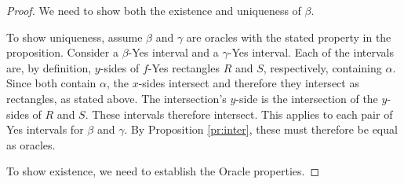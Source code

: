 \documentclass[12pt]{article}
\theoremstyle{remark}
\begin{document}
\begin{proof}
We need to show both the existence and uniqueness of $\beta$.

To show uniqueness, assume $\beta$ and $\gamma$ are oracles with the stated property in the proposition. Consider a $\beta$-Yes interval and a  $\gamma$-Yes interval. Each of the intervals are, by definition, $y$-sides of $f$-Yes rectangles $R$ and $S$, respectively, containing $\alpha$. Since both contain $\alpha$, the $x$-sides intersect and therefore they intersect as rectangles, as stated above. The intersection's $y$-side is the intersection of the $y$-sides of $R$ and $S$. These intervals therefore intersect. This applies to each pair of Yes intervals for $\beta$ and $\gamma$. By Proposition \ref{pr:inter}, these must therefore be equal as oracles. 

To show existence, we need to establish the Oracle properties. 


\end{proof}
\end{document}
